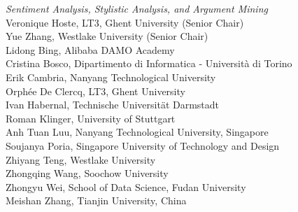 \emph{Sentiment Analysis, Stylistic Analysis, and Argument Mining} \\
\hspace*{0.2in} Veronique Hoste, LT3, Ghent University (Senior Chair)\\
\hspace*{0.2in} Yue Zhang, Westlake University (Senior Chair)\\
\hspace*{0.2in} Lidong Bing, Alibaba DAMO Academy\\
\hspace*{0.2in} Cristina Bosco, Dipartimento di Informatica - Università di Torino\\
\hspace*{0.2in} Erik Cambria, Nanyang Technological University\\
\hspace*{0.2in} Orph\'ee De Clercq, LT3, Ghent University\\
\hspace*{0.2in} Ivan Habernal, Technische Universität Darmstadt\\
\hspace*{0.2in} Roman Klinger, University of Stuttgart\\
\hspace*{0.2in} Anh Tuan Luu, Nanyang Technological University, Singapore\\
\hspace*{0.2in} Soujanya Poria, Singapore University of Technology and Design\\
\hspace*{0.2in} Zhiyang Teng, Westlake University\\
\hspace*{0.2in} Zhongqing Wang, Soochow University\\
\hspace*{0.2in} Zhongyu Wei, School of Data Science, Fudan University\\
\hspace*{0.2in} Meishan Zhang, Tianjin University, China\\

